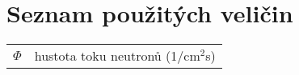 \section*{Seznam použitých veličin}

\renewcommand{\arraystretch}{1.2}
\begin{table}[H]
\begin{tabular}{p{1cm}l}
  $\Phi$          & hustota toku neutronů (1/cm$^2$s) \\
\end{tabular}
\end{table}
\renewcommand{\arraystretch}{1}
